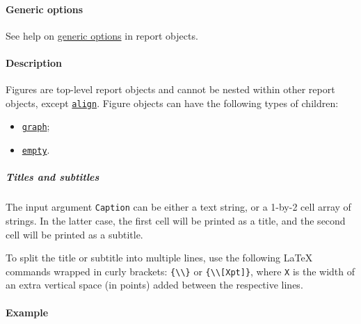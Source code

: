  \paragraph{Generic options}
 
 See help on \href{report/Contents}{generic options} in report objects.
 
 \paragraph{Description}
 
 Figures are top-level report objects and cannot be nested within other
 report objects, except \href{report/align}{\texttt{align}}. Figure
 objects can have the following types of children:
 
 \begin{itemize}
 \item
   \href{report/graph}{\texttt{graph}};
 \item
   \href{report/empty}{\texttt{empty}}.
 \end{itemize}
 
 \subparagraph{Titles and subtitles}
 
 The input argument \texttt{Caption} can be either a text string, or a
 1-by-2 cell array of strings. In the latter case, the first cell will be
 printed as a title, and the second cell will be printed as a subtitle.
 
 To split the title or subtitle into multiple lines, use the following
 LaTeX commands wrapped in curly brackets:
 \texttt{\{\textbackslash{}\textbackslash{}\}} or
 \texttt{\{\textbackslash{}\textbackslash{}{[}Xpt{]}\}}, where \texttt{X}
 is the width of an extra vertical space (in points) added between the
 respective lines.
 
 \paragraph{Example}


